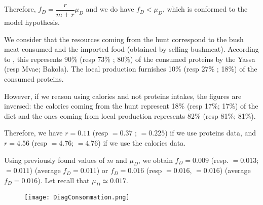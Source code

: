 \documentclass{article}
\begin{document}
\begin{itemize}
Therefore, $f_D = \dfrac{r}{m + r} \mu_D$ and we do have $f_D < \mu_D$, which is conformed to the model hypothesis.

We consider that the resources coming from the hunt correspond to the bush meat consumed and the imported food (obtained by selling bushmeat). According to \cite{koppert_consommation_1996}, this represents 90\% (resp 73\% ; 80\%) of the consumed proteins by the Yassa (resp Mvae; Bakola). The local production furnishes 10\% (resp 27\% ; 18\%) of the consumed proteins. 

However, if we reason using calories and not proteins intakes, the figures are inversed: the calories coming from the hunt represent 18\% (resp 17\%; 17\%) of the diet and the ones coming from local production represents 82\% (resp 81\%; 81\%).

Therefore, we have $r = 0.11$ (resp $=0.37$ ; $=0.225$) if we use proteins data, and $r = 4.56$ (resp $=4.76$; $=4.76$) if we use the calories data.

Using previously found values of $m$ and $\mu_D$, we obtain $f_D = 0.009$ (resp. $=0.013$; $=0.011$) (average $f_D = 0.011$) or $f_D = 0.016$ (resp $=0.016$, $= 0.016$) (average $f_D = 0.016$). Let recall that $\mu_D \simeq 0.017$.

 \begin{figure}
 \centering
 \texttt{[image: DiagConsommation.png]}
 \end{figure}

\end{itemize}



\newpage


\end{document}
